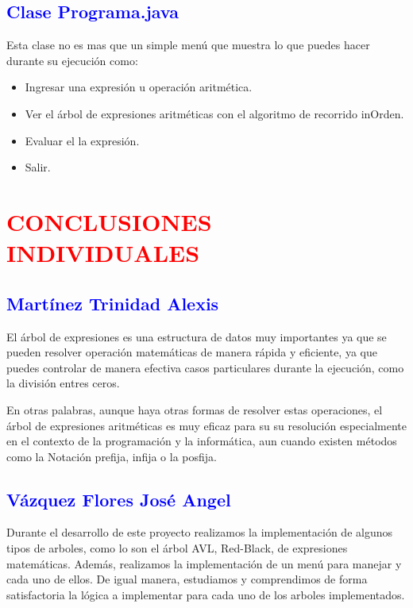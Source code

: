 \documentclass[12pt]{article}
\begin{document}
\subsection{\textcolor{blue}{Clase Programa.java}}

Esta clase no es mas que un simple menú que muestra lo que puedes hacer durante su ejecución como:
    \begin{itemize}
        \item Ingresar una expresión u operación aritmética.
        \item Ver el árbol de expresiones aritméticas con el algoritmo de recorrido inOrden.
        \item Evaluar el la expresión.
        \item Salir.
    \end{itemize}



\section*{\textcolor{red}{\textbf{CONCLUSIONES INDIVIDUALES}}}

\subsection*{\textcolor{blue}{Martínez Trinidad Alexis}}

El árbol de expresiones es una estructura de datos muy importantes ya que se pueden resolver operación matemáticas de manera rápida y eficiente, ya que puedes controlar de manera efectiva casos particulares durante la ejecución, como la división entres ceros. 

En otras palabras, aunque haya otras formas de resolver estas operaciones, el árbol de expresiones aritméticas es muy eficaz para su su resolución especialmente en el contexto de la programación y la informática, aun cuando existen métodos como la Notación prefija, infija o la posfija.

\subsection*{\textcolor{blue}{Vázquez Flores José Angel}}

Durante el desarrollo de este proyecto realizamos la implementación de algunos tipos de arboles, como lo son el árbol AVL, Red-Black, de expresiones matemáticas. Además, realizamos la implementación de un menú para manejar y cada uno de ellos. De igual manera, estudiamos y comprendimos de forma satisfactoria la lógica a implementar para cada uno de los arboles implementados. 
\end{document}
